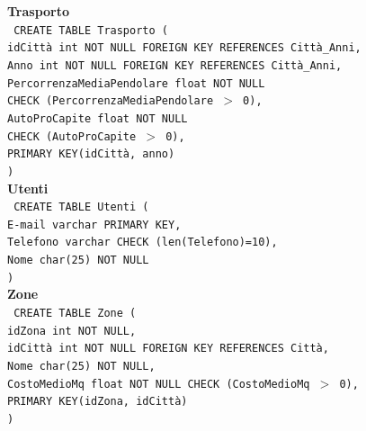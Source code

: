 \documentclass[a4paper,12pt]{report}
\begin{document}
                \noindent
                {\large \textbf{Trasporto}} \\
                \texttt{
                    CREATE TABLE Trasporto ( \\
                    \null\quad\quad idCittà                     int     NOT NULL FOREIGN KEY REFERENCES Città\_Anni, \\
                    \null\quad\quad Anno                        int     NOT NULL FOREIGN KEY REFERENCES Città\_Anni, \\
                    \null\quad\quad PercorrenzaMediaPendolare   float   NOT NULL \\
                            \null\qquad\qquad CHECK (PercorrenzaMediaPendolare $>$ 0), \\
                    \null\quad\quad AutoProCapite               float   NOT NULL \\
                            \null\qquad\qquad CHECK (AutoProCapite $>$ 0), \\
                    \null\quad\quad PRIMARY KEY(idCittà, anno) \\
                    )
                } \\

                \noindent
                {\large \textbf{Utenti}} \\
                \texttt{
                    CREATE TABLE Utenti ( \\
                    \null\quad\quad E-mail      varchar     PRIMARY KEY, \\
                    \null\quad\quad Telefono    varchar     CHECK (len(Telefono)=10), \\
                    \null\quad\quad Nome        char(25)    NOT NULL \\
                    )
                } \\

                \noindent
                {\large \textbf{Zone}} \\
                \texttt{
                    CREATE TABLE Zone ( \\
                    \null\quad\quad idZona          int         NOT NULL, \\
                    \null\quad\quad idCittà         int         NOT NULL FOREIGN KEY REFERENCES Città, \\
                    \null\quad\quad Nome            char(25)    NOT NULL, \\
                    \null\quad\quad CostoMedioMq    float       NOT NULL CHECK (CostoMedioMq $>$ 0), \\
                    \null\quad\quad PRIMARY KEY(idZona, idCittà) \\
                    )
                } \\
\end{document}
